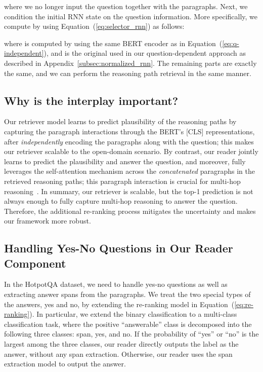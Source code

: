 \documentclass{article} \usepackage{iclr2020_conference,times}
\begin{document}
where we no longer input the question  together with the paragraphs.
Next, we condition the initial RNN state  on the question information.
More specifically, we compute  by using Equation~(\ref{eq:selector_rnn}) as follows:

where  is computed by using the same BERT encoder as in Equation~(\ref{eq:q-independent}), and  is the original  used in our question-dependent approach as described in Appendix~\ref{subsec:normalized_rnn}.
The remaining parts are exactly the same, and we can perform the reasoning path retrieval in the same manner.

\subsection{Why is the interplay important?}
\label{subsec:appendix_interplay}
Our retriever model learns to predict plausibility of the reasoning paths by capturing the paragraph interactions through the BERT's [CLS] representations, after {\it independently} encoding the paragraphs along with the question; this makes our retriever scalable to the open-domain scenario. 
By contrast, our reader jointly learns to predict the plausibility and answer the question, and moreover, fully leverages the self-attention mechanism across the {\it concatenated} paragraphs in the retrieved reasoning paths; this paragraph interaction is crucial for multi-hop reasoning~\citep{wang-etal-2019-multi-hop}.
In summary, our retriever is scalable, but the top-1 prediction is not always enough to fully capture multi-hop reasoning to answer the question.
Therefore, the additional re-ranking process mitigates the uncertainty and makes our framework more robust.


\subsection{Handling Yes-No Questions in Our Reader Component}
\label{subsec:appendix_modeling}
In the HotpotQA dataset, we need to handle yes-no questions as well as extracting answer spans from the paragraphs.
We treat the two special types of the answers, yes and no, by extending the re-ranking model in Equation~(\ref{eq:re-ranking}).
In particular, we extend the binary classification to a multi-class classification task, where the positive ``answerable'' class is decomposed into the following three classes: span, yes, and no.
If the probability of ``yes'' or ``no'' is the largest among the three classes, our reader directly outputs the label as the answer, without any span extraction.
Otherwise, our reader uses the span extraction model to output the answer.
\end{document}
